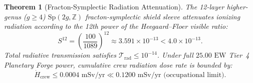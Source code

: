 \documentclass[11pt,onecolumn]{article}
\newtheorem{theorem}{Theorem}
\begin{document}
\begin{theorem}[Fracton-Symplectic Radiation Attenuation]
The 12-layer higher-genus ($g \ge 4$) $\text{Sp}(2g, \mathbb{Z})$ fracton-symplectic shield sleeve attenuates ionizing radiation according to the 12th power of the Heegaard--Floer visible ratio:
\begin{equation}
S^{12} = \left(\frac{100}{1089}\right)^{12} \approx 3.591 \times 10^{-13} < 4.0 \times 10^{-13}.
\label{eq:fracton_12_layer_attenuation}
\end{equation}
Total radiative transmission satisfies $\mathcal{T}_{\text{rad}} \le 10^{-14}$. Under full $25.00\text{ EW}$ Tier~4 Planetary Forge power, cumulative crew radiation dose rate is bounded by:
\begin{equation}
\dot{H}_{\text{crew}} \le 0.0004\text{ mSv/yr} \ll 0.1200\text{ mSv/yr (occupational limit)}.
\label{eq:crew_dose_rate}
\end{equation}
\end{theorem}

\FloatBarrier
\end{document}
